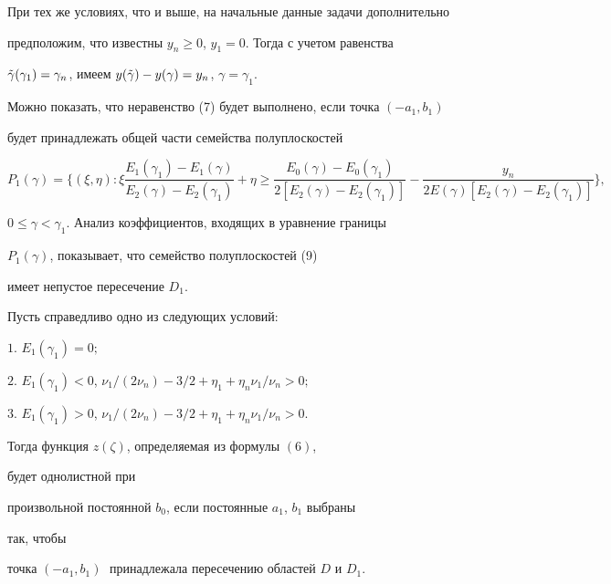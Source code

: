 При тех же условиях, что и выше, на начальные данные задачи дополнительно


предположим, что известны $y_n\ge 0$, $y_1=0$. Тогда с учетом равенства


$\Tilde\gamma(\gamma_1)=


\gamma_n$, имеем $y(\Tilde\gamma)-y(\gamma)=y_n$, $\gamma=\gamma_1$.


Можно показать, что неравенство (7) будет выполнено, если точка $(-a_1,b_1)$


будет принадлежать общей части семейства полуплоскостей


\begin{equation}


P_1(\gamma)=


\biggl\{ (\xi,\eta):\xi


\frac{E_1(\gamma_1)-E_1(\gamma)}{E_2(\gamma)-E_2(\gamma_1)}+


\eta\ge \frac{E_0(\gamma)-E_0(\gamma_1)}{2[E_2(\gamma)-E_2(\gamma_1)]}-


\frac{y_n} {2E(\gamma)[E_2(\gamma)-E_2(\gamma_1)]}\biggr\},


\end{equation}


$0\le\gamma < \gamma_1$. Анализ коэффициентов, входящих в уравнение границы


$P_1(\gamma)$, показывает, что семейство полуплоскостей (9)


имеет непустое пересечение $D_1$.





\begin{thm} Пусть справедливо одно из следующих условий:





$1.$ $E_1(\gamma_1)=0;$





$2.$ $E_1(\gamma_1)<0$, $\nu_1/(2\nu_n)-3/2+\eta_1+


\eta_n\nu_1/\nu_n>0;$





$3.$ $E_1(\gamma_1)>0$, $\nu_1/(2\nu_n)-3/2+\eta_1+


\eta_n\nu_1/\nu_n>0$.





Тогда функция $z(\zeta)$, определяемая из формулы $(6)$,


будет однолистной при


произвольной постоянной $b_0$, если постоянные $a_1$, $b_1$ выбраны


так, чтобы


точка $(-a_1,b_1)\;$ принадлежала пересечению областей $D$ и $D_1$.


\end{thm}





